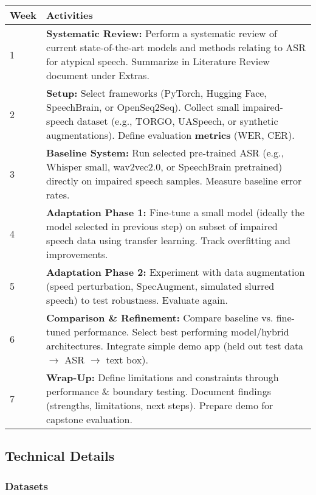 \documentclass{article}
\begin{document}
\begin{tabularx}{\textwidth}{@{}lX@{}}
\toprule
Week & Activities \\
\midrule
1 & \textbf{Systematic Review:} Perform a systematic review of current state-of-the-art models and methods relating to ASR for atypical speech. Summarize in Literature Review document under Extras. \\
\hline
2 & \textbf{Setup:} Select frameworks (PyTorch, Hugging Face, SpeechBrain, or OpenSeq2Seq). Collect small impaired-speech dataset (e.g., TORGO, UASpeech, or synthetic augmentations). Define evaluation \textbf{metrics} (WER, CER). \\
\hline
3 & \textbf{Baseline System:} Run selected pre-trained ASR (e.g., Whisper small, wav2vec2.0, or SpeechBrain pretrained) directly on impaired speech samples. Measure baseline error rates. \\
\hline
4 & \textbf{Adaptation Phase 1:} Fine-tune a small model (ideally the model selected in previous step) on subset of impaired speech data using transfer learning. Track overfitting and improvements. \\
\hline
5 & \textbf{Adaptation Phase 2:} Experiment with data augmentation (speed perturbation, SpecAugment, simulated slurred speech) to test robustness. Evaluate again. \\
\hline
6 & \textbf{Comparison \& Refinement:} Compare baseline vs. fine-tuned performance. Select best performing model/hybrid architectures. Integrate simple demo app (held out test data $\rightarrow$ ASR $\rightarrow$ text box). \\
\hline
7 & \textbf{Wrap-Up:} Define limitations and constraints through performance \& boundary testing. Document findings (strengths, limitations, next steps). Prepare demo for capstone evaluation. \\
\bottomrule
\end{tabularx}


\subsection{Technical Details}

\subsubsection{Datasets}
\end{document}
